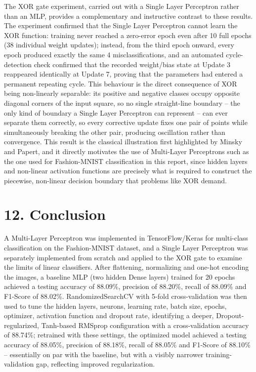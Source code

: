 \documentclass[11pt,a4paper]{article}
\begin{document}
The XOR gate experiment, carried out with a Single Layer Perceptron rather than an MLP, provides a complementary and instructive contrast to these results. The experiment confirmed that the Single Layer Perceptron cannot learn the XOR function: training never reached a zero-error epoch even after 10 full epochs (38 individual weight updates); instead, from the third epoch onward, every epoch produced exactly the same 4 misclassifications, and an automated cycle-detection check confirmed that the recorded weight/bias state at Update 3 reappeared identically at Update 7, proving that the parameters had entered a permanent repeating cycle. This behaviour is the direct consequence of XOR being non-linearly separable: its positive and negative classes occupy opposite diagonal corners of the input square, so no single straight-line boundary -- the only kind of boundary a Single Layer Perceptron can represent -- can ever separate them correctly, so every corrective update fixes one pair of points while simultaneously breaking the other pair, producing oscillation rather than convergence. This result is the classical illustration first highlighted by Minsky and Papert, and it directly motivates the use of Multi-Layer Perceptrons such as the one used for Fashion-MNIST classification in this report, since hidden layers and non-linear activation functions are precisely what is required to construct the piecewise, non-linear decision boundary that problems like XOR demand.
\section*{12. Conclusion}

A Multi-Layer Perceptron was implemented in TensorFlow/Keras for multi-class classification on the Fashion-MNIST dataset, and a Single Layer Perceptron was separately implemented from scratch and applied to the XOR gate to examine the limits of linear classifiers. After flattening, normalizing and one-hot encoding the images, a baseline MLP (two hidden Dense layers) trained for 20 epochs achieved a testing accuracy of 88.09\%, precision of 88.20\%, recall of 88.09\% and F1-Score of 88.02\%. RandomizedSearchCV with 5-fold cross-validation was then used to tune the hidden layers, neurons, learning rate, batch size, epochs, optimizer, activation function and dropout rate, identifying a deeper, Dropout-regularized, Tanh-based RMSprop configuration with a cross-validation accuracy of 88.74\%; retrained with these settings, the optimized model achieved a testing accuracy of 88.05\%, precision of 88.18\%, recall of 88.05\% and F1-Score of 88.10\% -- essentially on par with the baseline, but with a visibly narrower training-validation gap, reflecting improved regularization.
\end{document}
